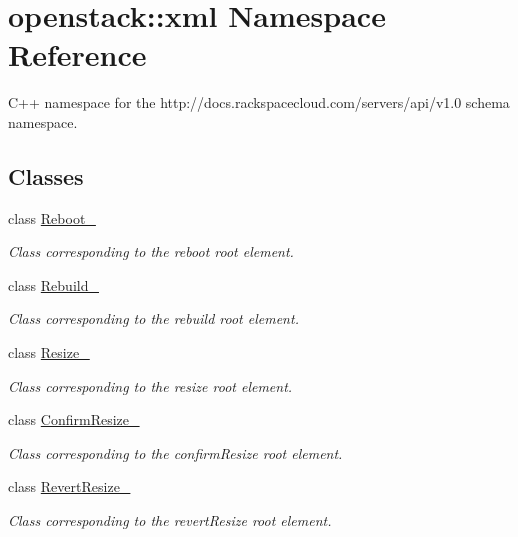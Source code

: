 \hypertarget{namespaceopenstack_1_1xml}{
\section{openstack::xml Namespace Reference}
\label{namespaceopenstack_1_1xml}
}


C++ namespace for the http://docs.rackspacecloud.com/servers/api/v1.0 schema namespace.  


\subsection*{Classes}
\begin{DoxyCompactItemize}
\item 
class \hyperlink{classopenstack_1_1xml_1_1Reboot__}{Reboot\_\-}
\begin{DoxyCompactList}\small\item\em Class corresponding to the reboot root element. \item\end{DoxyCompactList}\item 
class \hyperlink{classopenstack_1_1xml_1_1Rebuild__}{Rebuild\_\-}
\begin{DoxyCompactList}\small\item\em Class corresponding to the rebuild root element. \item\end{DoxyCompactList}\item 
class \hyperlink{classopenstack_1_1xml_1_1Resize__}{Resize\_\-}
\begin{DoxyCompactList}\small\item\em Class corresponding to the resize root element. \item\end{DoxyCompactList}\item 
class \hyperlink{classopenstack_1_1xml_1_1ConfirmResize__}{ConfirmResize\_\-}
\begin{DoxyCompactList}\small\item\em Class corresponding to the confirmResize root element. \item\end{DoxyCompactList}\item 
class \hyperlink{classopenstack_1_1xml_1_1RevertResize__}{RevertResize\_\-}
\begin{DoxyCompactList}\small\item\em Class corresponding to the revertResize root element. \item\end{DoxyCompactList}\item 

\end{DoxyCompactItemize}
